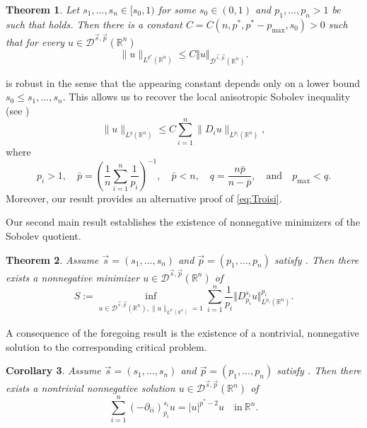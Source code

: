 \documentclass[11pt]{amsart}
\theoremstyle{plain}
\newtheorem{theorem}{Theorem}[section]
\newtheorem{corollary}[theorem]{Corollary}
\theoremstyle{definition}
\numberwithin{equation}{section}
\newcommand{\R}{\mathbb{R}}
\newcommand{\Dsp}{\mathcal{D}^{\vec{s},\vec{p}}(\mathbb{R}^n)}
\begin{document}
\begin{theorem} \label{thm:sobolev}
Let $s_1,\dots,s_n\in[s_0,1)$ for some $s_0\in(0,1)$ and $p_1,\dots,p_n>1$ be such that  holds.
Then there is a constant $C = C(n, p^{\ast}, p^{\ast}-p_{\max}, s_0) > 0$ such that
for every $u \in \Dsp$
\begin{equation*}
\|u\|_{L^{p^{\ast}}(\mathbb{R}^n)} \leq C\Vert u \Vert_{\Dsp}.
\end{equation*}
\end{theorem}

 is robust in the sense that the appearing constant depends only on a lower bound $s_0 \le s_1,\dots,s_n$. This allows us to recover the local anisotropic Sobolev inequality (see \cite{Troi69,Rak79,Rak80,KK83})
\begin{equation} \label{eq:Troisi}
\|u\|_{L^q(\mathbb{R}^n)} \leq C \sum_{i=1}^n \|D_i u\|_{L^{p_i}(\mathbb{R}^n)},
\end{equation}
where
\begin{equation} \label{eq:p}
p_i > 1, \quad \bar{p}=\left( \frac{1}{n} \sum_{i=1}^n \frac{1}{p_i} \right)^{-1}, \quad \bar{p}<n, \quad q = \frac{n\bar{p}}{n-\bar{p}}, \quad \text{and}\quad p_{\max} < q.
\end{equation}
Moreover, our result provides an alternative proof of \eqref{eq:Troisi}.

Our second main result establishes the existence of nonnegative minimizers of the Sobolev quotient.

\begin{theorem} \label{thm:existence}
Assume $\vec{s}=(s_1,\dots,s_n)$ and $\vec{p}=(p_1,\dots,p_n)$ satisfy .
Then there exists a nonnegative minimizer $u \in \mathcal{D}^{\vec{s},\vec{p}}(\mathbb{R}^n)$ of
\begin{equation} \label{eq:min_prob}
S:= \inf_{u \in \mathcal{D}^{\vec{s},\vec{p}}(\mathbb{R}^n), \|u\|_{L^{p^\ast}(\mathbb{R}^n)}=1} \sum_{i=1}^n \frac{1}{p_i} \Vert D^{s_i}_{p_i}u\Vert_{L^{p_i}(\R^n)}^{p_i}.
\end{equation}
\end{theorem}
A consequence of the foregoing result is the existence of a nontrivial, nonnegative solution to the corresponding critical problem.
\begin{corollary}
\label{cor:existence}
Assume $\vec{s}=(s_1,\dots,s_n)$ and $\vec{p}=(p_1,\dots,p_n)$ satisfy .
Then there exists a nontrivial nonnegative solution $u \in \mathcal{D}^{\vec{s},\vec{p}}(\mathbb{R}^n)$ of
\begin{equation} \label{eq:main_eq}
\sum_{i=1}^n (-\partial_{ii})^{s_i}_{p_i} u = |u|^{p^{\ast}-2}u \quad \text{in}~ \mathbb{R}^n.
\end{equation}
\end{corollary}
\end{document}

